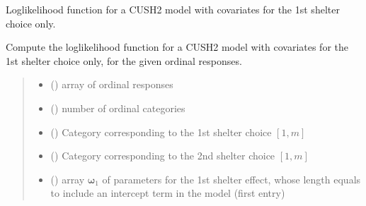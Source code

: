 \documentclass[letterpaper,10pt,english]{sphinxmanual}
\begin{document}

\begin{fulllineitems}
\label{\detokenize{cubmods:cubmods.cush2_x0.loglik}}
\pysigstartsignatures
{}
\pysigstopsignatures
\sphinxAtStartPar
Log\sphinxhyphen{}likelihood function for a CUSH2 model with covariates
for the 1st shelter choice only.

\sphinxAtStartPar
Compute the log\sphinxhyphen{}likelihood function for a CUSH2 model 
with covariates for the 1st shelter choice only,
for the given ordinal responses.
\begin{quote}\begin{description}
\begin{itemize}
\item {} 
\sphinxAtStartPar
{} () \textendash{} array of ordinal responses

\item {} 
\sphinxAtStartPar
{} () \textendash{} number of ordinal categories

\item {} 
\sphinxAtStartPar
{} () \textendash{} Category corresponding to the 1st shelter choice \([1,m]\)

\item {} 
\sphinxAtStartPar
{} () \textendash{} Category corresponding to the 2nd shelter choice \([1,m]\)

\item {} 
\sphinxAtStartPar
{} () \textendash{} array \(\pmb \omega_1\) of parameters for the 1st shelter effect, whose length equals 
 to include an intercept term in the model (first entry)


\end{itemize}
\end{description}
\end{quote}
\end{fulllineitems}
\end{document}

